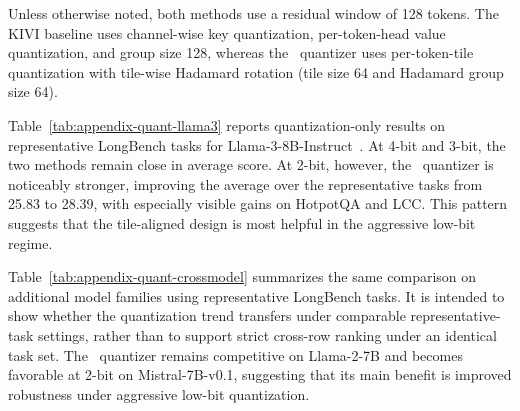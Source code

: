Unless otherwise noted, both methods use a residual window of 128 tokens. The KIVI baseline uses channel-wise key quantization, per-token-head value quantization, and group size 128, whereas the \method\ quantizer uses per-token-tile quantization with tile-wise Hadamard rotation (tile size 64 and Hadamard group size 64).

Table~\ref{tab:appendix-quant-llama3} reports quantization-only results on representative LongBench tasks for Llama-3-8B-Instruct~\cite{grattafiori2024llama3}. At 4-bit and 3-bit, the two methods remain close in average score. At 2-bit, however, the \method\ quantizer is noticeably stronger, improving the average over the representative tasks from 25.83 to 28.39, with especially visible gains on HotpotQA and LCC. This pattern suggests that the tile-aligned design is most helpful in the aggressive low-bit regime.

Table~\ref{tab:appendix-quant-crossmodel} summarizes the same comparison on additional model families using representative LongBench tasks. It is intended to show whether the quantization trend transfers under comparable representative-task settings, rather than to support strict cross-row ranking under an identical task set. The \method\ quantizer remains competitive on Llama-2-7B and becomes favorable at 2-bit on Mistral-7B-v0.1, suggesting that its main benefit is improved robustness under aggressive low-bit quantization.

\begin{table}[t]
\centering
\caption{Quantization-only comparison on representative LongBench tasks for Llama-3-8B-Instruct. Avg.\ is computed over the reported representative tasks.}
\label{tab:appendix-quant-llama3}
\setlength{\tabcolsep}{4pt}
\end{table}

